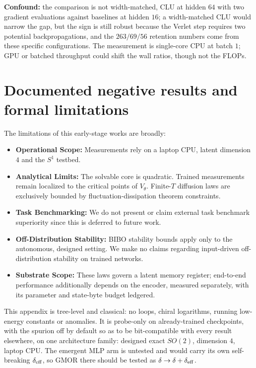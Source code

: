 \documentclass[mlabstract,onecolumn]{jmlr}
\begin{document}
\textbf{Confound:} the comparison is not width-matched, CLU at hidden $64$ with two gradient evaluations against baselines at hidden $16$; a width-matched CLU would narrow the gap, but the sign is still robust because the Verlet step requires two potential backpropagations, and the $263/69/56$ retention numbers come from these specific configurations. The measurement is single-core CPU at batch $1$; GPU or batched throughput could shift the wall ratios, though not the FLOPs.

\section{Documented negative results and formal limitations}\label{app:neg}

The limitations of this early-stage works are broadly:

\begin{itemize}
    \item \textbf{Operational Scope:} Measurements rely on a laptop CPU, latent dimension $4$ and the $S^1$ testbed.
    \item \textbf{Analytical Limits:} The solvable core is quadratic. Trained measurements remain localized to the critical points of $V_\theta$. Finite-$T$ diffusion laws are exclusively bounded by fluctuation-dissipation theorem constraints.
    \item \textbf{Task Benchmarking:} We do not present or claim external task benchmark superiority since this is deferred to future work.
    \item \textbf{Off-Distribution Stability:} BIBO stability bounds apply only to the autonomous, designed setting. We make no claims regarding input-driven off-distribution stability on trained networks.
    \item \textbf{Substrate Scope:} These laws govern a latent memory register; end-to-end performance additionally depends on the encoder, measured separately, with its parameter and state-byte budget ledgered.
\end{itemize}

This appendix is tree-level and classical: no loops, chiral logarithms, running low-energy constants or anomalies. It is probe-only on already-trained checkpoints, with the spurion off by default so as to be bit-compatible with every result elsewhere, on one architecture family: designed exact $SO(2)$, dimension $4$, laptop CPU. The emergent MLP arm is untested and would carry its own self-breaking $\delta_{\rm eff}$, so GMOR there should be tested as $\delta\to\delta+\delta_{\rm eff}$.
\end{document}
